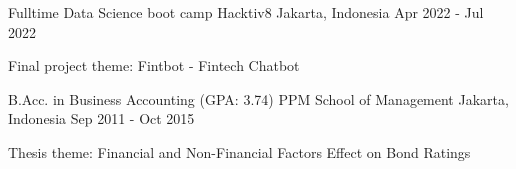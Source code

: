 

\begin{cventries}

  \cventry
    {Fulltime Data Science boot camp} %
    {Hacktiv8} %
    {Jakarta, Indonesia} %
    {Apr 2022 - Jul 2022} %
    {
      \begin{cvitems} %
        \item {Final project theme: Fintbot - Fintech Chatbot}
      \end{cvitems}
    }

  \cventry
    {B.Acc. in Business Accounting (GPA: 3.74)} %
    {PPM School of Management} %
    {Jakarta, Indonesia} %
    {Sep 2011 - Oct 2015} %
    {
      \begin{cvitems} %
        \item {Thesis theme: Financial and Non-Financial Factors Effect on Bond Ratings}
      \end{cvitems}
    }

\end{cventries}
